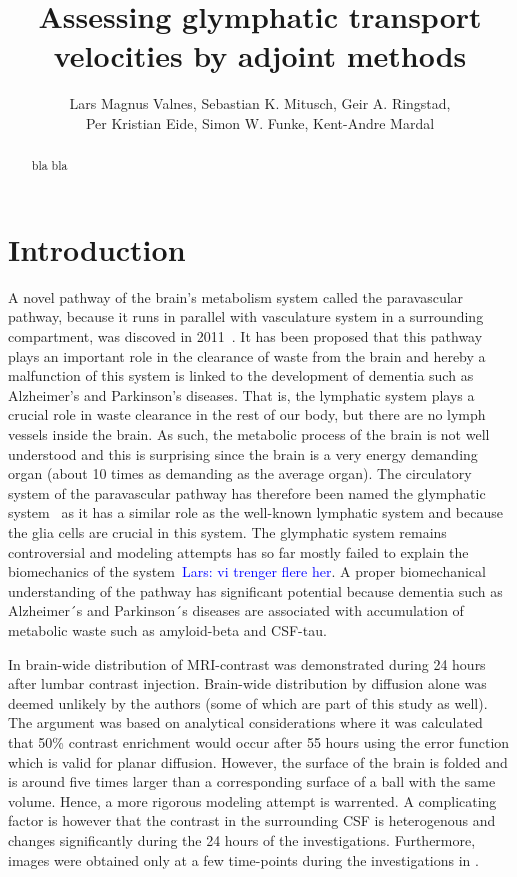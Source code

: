 \documentclass[11pt,a4paper]{article}
\title{Assessing glymphatic transport velocities by adjoint methods}
\author{Lars Magnus Valnes, Sebastian K. Mitusch, Geir A. Ringstad, \\ 
Per Kristian Eide, Simon W. Funke, Kent-Andre Mardal }
\newcommand{\kam}[1]{\textcolor{blue}{#1}}
\begin{document}
\maketitle

\begin{abstract}
bla bla 
\end{abstract}
\section{Introduction}

A novel pathway of the brain's metabolism system called the paravascular pathway, because it runs in parallel with 
vasculature system in a surrounding compartment,  
was discoved in 2011~\cite{iliff2012paravascular}. 
It has been proposed that this pathway plays an important role in the clearance of waste
from the brain and hereby a malfunction of this system is linked to  the development of dementia such as Alzheimer's and Parkinson's diseases. That is, 
the lymphatic system plays a crucial role in waste clearance in the rest of our body, but there are no lymph vessels inside
the brain. As such, the metabolic process of the brain is not well understood and this is surprising since the brain is a very 
energy demanding organ (about 10 times as demanding as the average organ). The circulatory system of the paravascular pathway 
has therefore been named the glymphatic system~\cite{jessen2015glymphatic} as it has a similar role as the well-known lymphatic system and because the glia cells 
are crucial in this system.  
The glymphatic system remains controversial and modeling attempts
has so far mostly failed to explain the biomechanics of the system~\cite{asgari2016glymphatic, holter2017interstitial, smith2017glymphatic}\kam{Lars: vi trenger flere her}. A proper biomechanical 
understanding of the pathway has significant potential because
dementia such as Alzheimer´s and Parkinson´s diseases are
associated with accumulation of metabolic waste such as
amyloid-beta and CSF-tau.  

In \cite{ringstad2018brain} brain-wide distribution of MRI-contrast was demonstrated during 24 hours after lumbar contrast injection. Brain-wide distribution by diffusion alone was deemed unlikely by the authors (some of which are part 
of this study as well). The argument was based on analytical considerations where it was calculated that 50\% contrast enrichment would occur after 
55 hours using the error function which is valid for planar diffusion. However, 
the surface of the brain is folded and is around five times larger than 
a corresponding surface of a ball with the same volume. Hence, 
a more rigorous modeling attempt is warrented. A complicating factor
is however that the contrast in the surrounding CSF is heterogenous
and changes significantly during the 24 hours of the investigations. 
Furthermore, images were obtained only at a few time-points during the investigations in \cite{ringstad2018brain}.  
\end{document}
